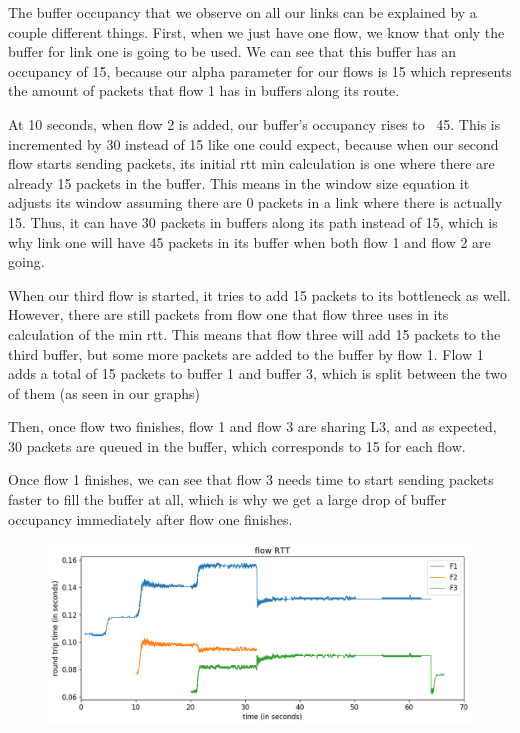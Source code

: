 \documentclass{article}
\begin{document}
The buffer occupancy that we observe on all our links can be explained by a couple different things. First, when we just have one flow, we know that only the buffer for link one is going to be used. We can see that this buffer has an occupancy of 15, because our alpha parameter for our flows is 15 which represents the amount of packets that flow 1 has in buffers along its route. 

At 10 seconds, when flow 2 is added, our buffer's occupancy rises to ~45. This is incremented by 30 instead of 15 like one could expect, because when our second flow starts sending packets, its initial rtt min calculation is one where there are already 15 packets in the buffer. This means in the window size equation it adjusts its window assuming there are 0 packets in a link where there is actually 15. Thus, it can have 30 packets in buffers along its path instead of 15, which is why link one will have 45 packets in its buffer when both flow 1 and flow 2 are going.

When our third flow is started, it tries to add 15 packets to its bottleneck as well. However, there are still packets from flow one that flow three uses in its calculation of the min rtt. This means that flow three will add 15 packets to the third buffer, but some more packets are added to the buffer by flow 1. Flow 1 adds a total of 15 packets to buffer 1 and buffer 3, which is split between the two of them (as seen in our graphs)

Then, once flow two finishes, flow 1 and flow 3 are sharing L3, and as expected, 30 packets are queued in the buffer, which corresponds to 15 for each flow.

Once flow 1 finishes, we can see that flow 3 needs time to start sending packets faster to fill the buffer at all, which is why we get a large drop of buffer occupancy immediately after flow one finishes.

\begin{figure}[H]
\centering
\includegraphics[width = \textwidth]{test_case2_fast flow RTT.png}
\end{figure}
\end{document}
